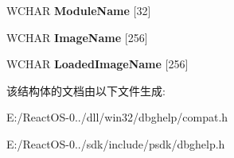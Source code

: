 \begin{DoxyCompactItemize}
\mbox{\label{struct___i_m_a_g_e_h_l_p___m_o_d_u_l_e_w_a2d9faefd9aeab6ec2c5101666689c18e}} 
W\+C\+H\+AR {\bfseries Module\+Name} \mbox{[}32\mbox{]}
\item 
\mbox{\label{struct___i_m_a_g_e_h_l_p___m_o_d_u_l_e_w_a39244fc7257e3407803b7d462a0b5fdf}} 
W\+C\+H\+AR {\bfseries Image\+Name} \mbox{[}256\mbox{]}
\item 
\mbox{\label{struct___i_m_a_g_e_h_l_p___m_o_d_u_l_e_w_ad4d21b9fa63c9001745e8951783c03c0}} 
W\+C\+H\+AR {\bfseries Loaded\+Image\+Name} \mbox{[}256\mbox{]}
\end{DoxyCompactItemize}


该结构体的文档由以下文件生成\+:\begin{DoxyCompactItemize}
\item 
E\+:/\+React\+O\+S-\/0../dll/win32/dbghelp/compat.\+h\item 
E\+:/\+React\+O\+S-\/0../sdk/include/psdk/dbghelp.\+h\end{DoxyCompactItemize}
